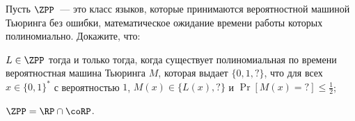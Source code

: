 Пусть $\ZPP$~--- это класс языков, которые принимаются вероятностной машиной Тьюринга без ошибки, математическое ожидание
времени работы которых полиномиально. Докажите, что:
\begin{enumcyr}
    \item $L \in \ZPP$ тогда и только тогда, когда существует полиномиальная по времени вероятностная машина Тьюринга $M$,
	    которая выдает $\{0, 1, ?\}$, что для всех $x \in \{0, 1\}^*$ с вероятностью $1$, $M(x) \in \{L(x), ?\}$ и $\Pr[M(x)
        = {?}] \le \frac{1}{2}$;
    \item $\ZPP = \RP \cap \coRP$.
\end{enumcyr}